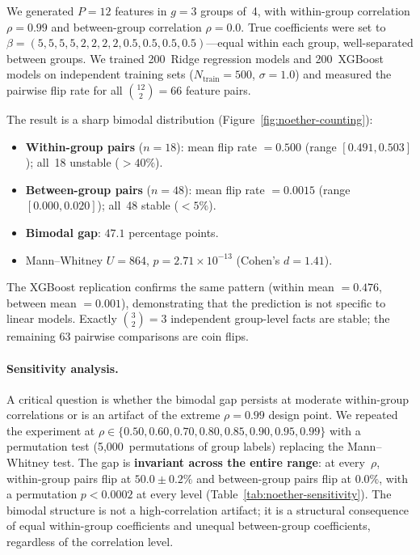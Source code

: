 \documentclass[11pt,a4paper]{article}
\begin{document}
We generated $P = 12$ features in $g = 3$ groups of~4, with within-group
correlation $\rho = 0.99$ and between-group correlation $\rho = 0.0$.  True
coefficients were set to $\beta = (5, 5, 5, 5, 2, 2, 2, 2, 0.5, 0.5, 0.5,
0.5)$---equal within each group, well-separated between groups.  We trained
200~Ridge regression models and 200~XGBoost models on independent training sets
($N_{\text{train}} = 500$, $\sigma = 1.0$) and measured the pairwise flip rate
for all $\binom{12}{2} = 66$ feature pairs.

The result is a sharp bimodal distribution (Figure~\ref{fig:noether-counting}):

\begin{itemize}
  \item \textbf{Within-group pairs} ($n = 18$): mean flip rate $= 0.500$
    (range $[0.491, 0.503]$); all~18 unstable ($> 40\%$).
  \item \textbf{Between-group pairs} ($n = 48$): mean flip rate $= 0.0015$
    (range $[0.000, 0.020]$); all~48 stable ($< 5\%$).
  \item \textbf{Bimodal gap}: $47.1$ percentage points.
  \item Mann--Whitney $U = 864$, $p = 2.71 \times 10^{-13}$ (Cohen's $d = 1.41$).
\end{itemize}

The XGBoost replication confirms the same pattern (within mean $= 0.476$,
between mean $= 0.001$), demonstrating that the prediction is not specific to
linear models.  Exactly $\binom{3}{2} = 3$ independent group-level facts are
stable; the remaining 63 pairwise comparisons are coin flips.

\paragraph{Sensitivity analysis.}
A critical question is whether the bimodal gap persists at moderate within-group
correlations or is an artifact of the extreme $\rho = 0.99$ design point.  We
repeated the experiment at $\rho \in \{0.50, 0.60, 0.70, 0.80, 0.85, 0.90,
0.95, 0.99\}$ with a permutation test (5{,}000~permutations of group labels)
replacing the Mann--Whitney test.  The gap is \textbf{invariant across the
entire range}: at every~$\rho$, within-group pairs flip at $50.0 \pm 0.2\%$
and between-group pairs flip at $0.0\%$, with a permutation $p < 0.0002$ at
every level (Table~\ref{tab:noether-sensitivity}).  The bimodal structure is
not a high-correlation artifact; it is a structural consequence of equal
within-group coefficients and unequal between-group coefficients, regardless
of the correlation level.
\end{document}
